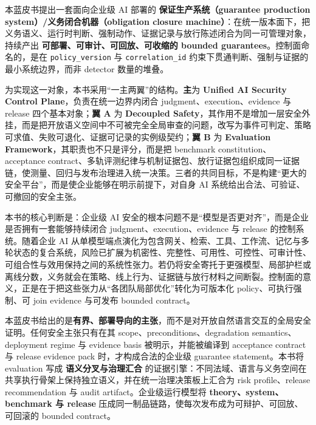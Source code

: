 \documentclass[11pt,a4paper]{report}
\begin{document}
\makebluebookfrontmatter

\begin{bluebookabstract}
本蓝皮书提出一套面向企业级 AI 部署的 \textbf{保证生产系统（guarantee production system）/义务闭合机器（obligation closure machine）}：在统一版本面下，把义务语义、运行时判断、强制动作、证据记录与放行陈述闭合为同一可管理对象，持续产出 \textbf{可部署、可审计、可回放、可收缩的 bounded guarantees}。控制面命名的，是在 \texttt{policy\_version} 与 \texttt{correlation\_id} 约束下贯通判断、强制与证据的最小系统边界，而非 detector 数量的堆叠。

为实现这一对象，本书采用“一主两翼”的结构。\textbf{主}为 \textbf{Unified AI Security Control Plane}，负责在统一边界内闭合 judgment、execution、evidence 与 release 四个基本对象；\textbf{翼 A} 为 \textbf{Decoupled Safety}，其作用不是增加一层安全外挂，而是把开放语义空间中不可被完全全局审查的问题，改写为事件可判定、策略可求值、失败可退化、证据可记录的实例级契约；\textbf{翼 B} 为 \textbf{Evaluation Framework}，其职责也不只是评分，而是把 benchmark constitution、acceptance contract、多轨评测纪律与机制证据包、放行证据包组织成同一证据链，使测量、回归与发布治理进入统一决策。三者的共同目标，不是构建“更大的安全平台”，而是使企业能够在明示前提下，对自身 AI 系统给出合法、可验证、可撤回的安全主张。

本书的核心判断是：企业级 AI 安全的根本问题不是“模型是否更对齐”，而是企业是否拥有一套能够持续闭合 judgment、execution、evidence 与 release 的控制系统。随着企业 AI 从单模型端点演化为包含网关、检索、工具、工作流、记忆与多轮状态的复合系统，风险已扩展为机密性、完整性、可用性、可控性、可审计性、可组合性与效用保持之间的系统性张力。若仍将安全寄托于更强模型、局部护栏或离线分数，义务就会在策略、线上行为、证据链与放行材料之间断裂。控制面的意义，正是在于把这些张力从“各团队局部优化”转化为可版本化 policy、可执行强制、可 join evidence 与可发布 bounded contract。

本蓝皮书给出的是\textbf{有界、部署导向的主张}，而不是对开放自然语言交互的全局安全证明。任何安全主张只有在其 scope、preconditions、degradation semantics、deployment regime 与 evidence basis 被明示，并能被编译到 acceptance contract 与 release evidence pack 时，才构成合法的企业级 guarantee statement。本书将 evaluation 写成 \textbf{语义分叉与治理汇合} 的证据引擎：不同法域、语言与义务空间在共享执行骨架上保持独立语义，并在统一治理决策板上汇合为 risk profile、release recommendation 与 audit artifact。企业级运行模型将 \textbf{theory、system、benchmark 与 release} 压成同一制品链路，使每次发布成为可辩护、可回放、可回滚的 bounded contract。

\end{bluebookabstract}
\end{document}
